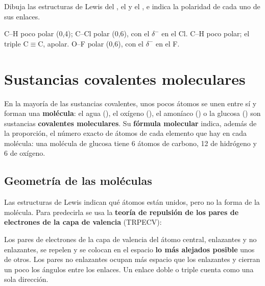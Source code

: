 \begin{exercise}
    Dibuja las estructuras de Lewis del , el  y el , e indica la polaridad de cada uno de sus enlaces.
    \begin{solu}
        \textcolor{red}{} \quad C--H poco polar (0,4); C--Cl polar
        (0,6), con el \(\delta^-\) en el Cl. \quad
        \textcolor{red}{} \quad C--H poco polar; el triple C\(\equiv\)C, apolar. \quad
        \textcolor{red}{} \quad
        O--F polar (0,6), con el \(\delta^-\) en el F.
    \end{solu}
\end{exercise}

\section{Sustancias covalentes moleculares}\label{sec:ud4-moleculares}

En la mayoría de las sustancias covalentes, unos pocos átomos se unen entre sí y forman una \textbf{molécula}: el agua (),
el oxígeno (), el amoníaco () o la glucosa () son sustancias \textbf{covalentes moleculares}. Su
\textbf{fórmula molecular} indica, además de la proporción, el número exacto de átomos de cada elemento que hay en cada molécula:
una molécula de glucosa tiene 6 átomos de carbono, 12 de hidrógeno y 6 de oxígeno.

\subsection{Geometría de las moléculas}

Las estructuras de Lewis indican qué átomos están unidos, pero no la forma de la molécula. Para predecirla se usa la
\textbf{teoría de repulsión de los pares de electrones de la capa de valencia} (TRPECV):

\begin{definition}[TRPECV]
    Los pares de electrones de la capa de valencia del átomo central, enlazantes y no enlazantes, se repelen y se colocan en el
    espacio \textbf{lo más alejados posible} unos de otros. Los pares no enlazantes ocupan más espacio que los enlazantes y cierran
    un poco los ángulos entre los enlaces. Un enlace doble o triple cuenta como una sola dirección.
\end{definition}

